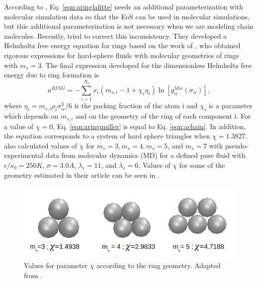 According to , Eq. \eqref{eqn:aringlafitte} needs an additional parameterization with molecular simulation data so that the EoS can  be used in molecular simulations, but this additional parameterization is not necessary when we are modeling chain molecules. Recently,  tried to correct this inconsistency. They developed a Helmholtz free energy equation for rings based on the work of , who obtained rigorous expressions for hard-sphere fluids with molecular geometries of rings with $m_s=3$. The final expression developed for the dimensionless Helmholtz free energy due to ring formation is
\begin{equation}
a^{RING} =-\sum_{i=1}^{N_{c}} x_{i}\left (m_{s,i}-1+\chi_{i}\eta_{i} \right )\ln \left [g_{ii}^{Mie}(\sigma_{ii}) \right] ,
\label{eqn:aringmuller}
\end{equation}
where $\eta_{i}=m_{s,i}\rho_{i}\sigma_{ii}^{3}/6$ is the packing fraction of the atom i and $\chi_{i}$ is a parameter which depends on $m_{s,i}$ and on the geometry of the ring of each component i. For a value of $\chi=0$, Eq. \eqref{eqn:aringmuller} is equal to Eq. \eqref{eqn:achain}. In addition, the equation corresponds to a system of hard sphere triangles when $\chi=1.3827$.  also calculated values of $\chi$ for $m_{s}=3,m_{s}=4,m_{s}=5$, and $m_{s}=7$ with pseudo-experimental data from molecular dynamics (MD) for a defined pure fluid with $\epsilon/\kappa_{b} = 250 K$, $\sigma = 3.0 \dot{A}$, $\lambda_{r} = 11$, and $\lambda_{r} = 6$. Values of $\chi$  for some of the geometry estimated in their article can be seen in .
\begin{figure}[th]
	\centering
	\includegraphics[scale=0.5]{Figures/mullergeo.png}
	\caption{Values for parameter $\chi$ according to the ring geometry. Adapted from .}
	\label{ringqsi}
\end{figure}

